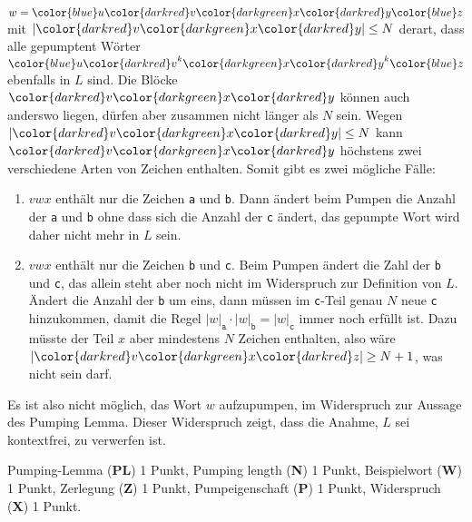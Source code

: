 \begin{loesung}
\begin{center}
\begin{tikzpicture}[>=latex,thick]
\end{tikzpicture}
\end{center}
$w=
{\color{blue}u}
{\color{darkred}v}
{\color{darkgreen}x}
{\color{darkred}y}
{\color{blue}z}$
mit
$|{\color{darkred}v}
{\color{darkgreen}x}
{\color{darkred}y}| \le N$ derart, dass alle gepumptent
Wörter
${\color{blue}u}{\color{darkred}v}^k
{\color{darkgreen}x}{\color{darkred}y}^k{\color{blue}z}$
ebenfalls in $L$ sind.
Die Blöcke 
${\color{darkred}v}{\color{darkgreen}x}{\color{darkred}y}$
können auch anderswo liegen, dürfen aber zusammen nicht länger
als $N$ sein.
Wegen
$|{\color{darkred}v}{\color{darkgreen}x}{\color{darkred}y}|\le N$
kann ${\color{darkred}v}{\color{darkgreen}x}{\color{darkred}y}$
höchstens zwei verschiedene Arten von Zeichen enthalten.
Somit gibt es zwei mögliche Fälle:
\begin{enumerate}
\item
$vwx$ enthält nur die Zeichen \texttt{a} und \texttt{b}.
Dann ändert beim Pumpen die Anzahl der \texttt{a} und \texttt{b} ohne
dass sich die Anzahl der \texttt{c} ändert, das gepumpte Wort wird daher
nicht mehr in $L$ sein.
\item
$vwx$ enthält nur die Zeichen \texttt{b} und \texttt{c}.
Beim Pumpen ändert die Zahl der \texttt{b} und \texttt{c}, das allein
steht aber noch nicht im Widerspruch zur Definition von $L$.
Ändert die Anzahl der \texttt{b} um eins, dann müssen im \texttt{c}-Teil
genau $N$ neue \texttt{c} hinzukommen, damit die Regel
$
|w|_{\texttt{a}}
\cdot
|w|_{\texttt{b}}
=
|w|_{\texttt{c}}
$
immer noch erfüllt ist.
Dazu müsste der Teil $x$ aber mindestens $N$ Zeichen enthalten, 
also wäre $|{\color{darkred}v}{\color{darkgreen}x}{\color{darkred}z}|\ge N+1$,
was nicht sein darf.
\end{enumerate}
Es ist also nicht möglich, das Wort $w$ aufzupumpen, im Widerspruch
zur Aussage des Pumping Lemma.
Dieser Widerspruch zeigt, dass die Anahme, $L$ sei kontextfrei, zu verwerfen
ist.
\end{loesung}

\begin{bewertung}
Pumping-Lemma ({\bf PL}) 1 Punkt,
Pumping length ({\bf N}) 1 Punkt,
Beispielwort ({\bf W}) 1 Punkt,
Zerlegung ({\bf Z}) 1 Punkt,
Pumpeigenschaft ({\bf P}) 1 Punkt,
Widerspruch ({\bf X}) 1 Punkt.
\end{bewertung}

